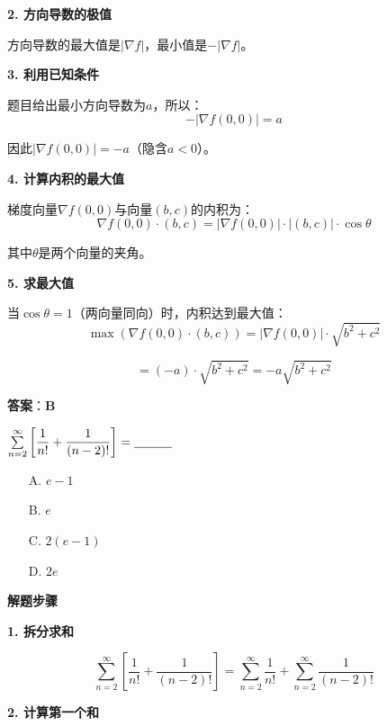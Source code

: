 \documentclass[standard]{ExBook}
\begin{document}
\begin{qitems}
\begin{bbox}
\begin{solution}
            \textbf{2. 方向导数的极值}
            
            方向导数的最大值是$|\nabla f|$，最小值是$-|\nabla f|$。
            
            \textbf{3. 利用已知条件}
            
            题目给出最小方向导数为$a$，所以：
            $$-|\nabla f(0,0)| = a$$
            
            因此$|\nabla f(0,0)| = -a$（隐含$a < 0$）。
            
            \textbf{4. 计算内积的最大值}
            
            梯度向量$\nabla f(0,0)$与向量$(b,c)$的内积为：
            $$\nabla f(0,0) \cdot (b,c) = |\nabla f(0,0)| \cdot |(b,c)| \cdot \cos\theta$$
            
            其中$\theta$是两个向量的夹角。
            
            \textbf{5. 求最大值}
            
            当$\cos\theta = 1$（两向量同向）时，内积达到最大值：
            $$\max(\nabla f(0,0) \cdot (b,c)) = |\nabla f(0,0)| \cdot \sqrt{b^2+c^2}$$
            
            $$= (-a) \cdot \sqrt{b^2+c^2} = -a\sqrt{b^2+c^2}$$
            
            \textbf{答案}：\textbf{B}
        \end{solution}
    \end{bbox}

    \begin{bbox}
        \qitem $\sum\limits_{n=2}^{\infty} \left[\dfrac{1}{n!} + \dfrac{1}{(n-2)!}\right] = \underline{\hspace{3em}}$
        \begin{itemize}
            \item[A.] $e-1$
            \item[B.] $e$
            \item[C.] $2(e-1)$
            \item[D.] $2e$
        \end{itemize}
        \begin{solution}
            \textbf{解题步骤}
            
            \textbf{1. 拆分求和}
            
            $$\sum_{n=2}^{\infty} \left[\frac{1}{n!} + \frac{1}{(n-2)!}\right] = \sum_{n=2}^{\infty} \frac{1}{n!} + \sum_{n=2}^{\infty} \frac{1}{(n-2)!}$$
            
            \textbf{2. 计算第一个和}
            

\end{solution}
\end{bbox}
\end{qitems}
\end{document}
